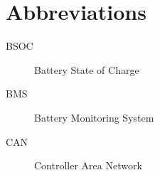 \chapter*{Abbreviations}\label{abbr}
\begin{description}
\item[BSOC] Battery State of Charge
\item[BMS] Battery Monitoring System
\item[CAN] Controller Area Network
\end{description}
